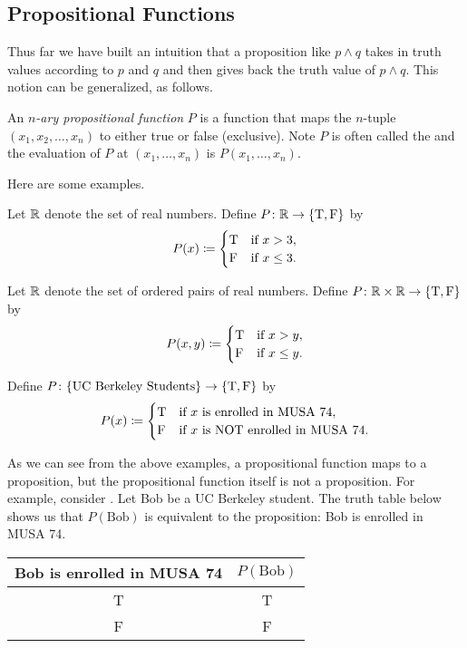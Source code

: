 \documentclass[../notes.tex]{subfiles}
\begin{document}
\subsection{Propositional Functions}
Thus far we have built an intuition that a proposition like $p\land q$ takes in truth values according to $p$ and $q$ and then gives back the truth value of $p\land q$. This notion can be generalized, as follows.
\begin{definition}
    An \textit{$n$-ary propositional function} $P$ is a function that maps the $n$-tuple $(x_1, x_2, \ldots, x_n)$ to either true or false (exclusive). Note $P$ is often called the  and the evaluation of $P$ at $(x_1, \ldots,x_n)$ is $P(x_1, \ldots,x_n)$.
\end{definition}
Here are some examples.
\begin{example}
    Let $\mathbb R$ denote the set of real numbers. Define $P\colon \mathbb{R} \rightarrow \{\text T,\text F \}$ by
    \[P(x)\coloneqq\begin{cases}
        \text T & \text{if } x > 3, \\
        \text F & \text{if } x \leq 3.
    \end{cases}\]
\end{example}
\begin{example}
    Let $\mathbb R$ denote the set of ordered pairs of real numbers. Define $P\colon \mathbb{R} \times \mathbb{R} \rightarrow \{\text T,\text F \}$ by
    \[P(x,y)\coloneqq\begin{cases}
        \text T & \text{if } x > y,\\
        \text F & \text{if } x \leq y.
    \end{cases}\]
\end{example}
\begin{example} \label{ex:musa-74-function}
    Define $P\colon \{\text{UC Berkeley Students}\} \rightarrow \{\text T,\text F \}$ by
    \[P(x)\coloneqq\begin{cases}
        \text T & \text{if $x$ is enrolled in MUSA 74},\\
        \text F & \text{if $x$ is NOT enrolled in MUSA 74}.
    \end{cases}\]
\end{example}
As we can see from the above examples, a propositional function maps to a proposition, but the propositional function itself is not a proposition. For example, consider . Let Bob be a UC Berkeley student. The truth table below shows us that $P(\text{Bob})$ is equivalent to the proposition: Bob is enrolled in MUSA 74.
\begin{center}
    \begin{tabular}{c|c}
         Bob is enrolled in MUSA 74 & $P(\text{Bob})$ \\
         \hline
         T & T \\
         F & F \\
    \end{tabular}
\end{center}
\end{document}

